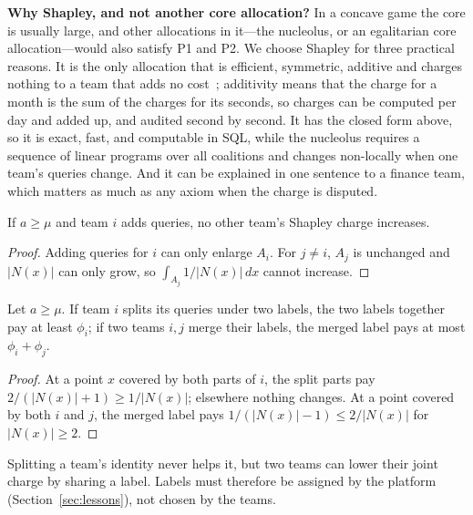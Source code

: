 \documentclass[sigconf]{acmart}
\begin{document}
\textbf{Why Shapley, and not another core allocation?} In a concave game the core is usually large, and other allocations
in it---the nucleolus, or an egalitarian core allocation---would also satisfy P1 and P2. We choose Shapley for three
practical reasons. It is the only allocation that is efficient, symmetric, additive and charges nothing to a team that adds
no cost~\cite{shapley53}; additivity means that the charge for a month is the sum of the charges for its seconds, so
charges can be computed per day and added up, and audited second by second. It has the closed form above, so it is exact,
fast, and computable in SQL, while the nucleolus requires a sequence of linear programs over all coalitions and changes
non-locally when one team's queries change. And it can be explained in one sentence to a finance team, which matters as
much as any axiom when the charge is disputed.

\begin{proposition}\label{prop:bystander}
If $a \ge \mu$ and team $i$ adds queries, no other team's Shapley charge increases.
\end{proposition}
\begin{proof}
Adding queries for $i$ can only enlarge $A_i$. For $j \neq i$, $A_j$ is unchanged and $|N(x)|$ can only grow, so
$\int_{A_j} 1/|N(x)|\,dx$ cannot increase.
\end{proof}

\begin{proposition}[Labels]\label{prop:labels}
Let $a \ge \mu$. If team $i$ splits its queries under two labels, the two labels together pay at least $\phi_i$; if two
teams $i, j$ merge their labels, the merged label pays at most $\phi_i + \phi_j$.
\end{proposition}
\begin{proof}
At a point $x$ covered by both parts of $i$, the split parts pay $2/(|N(x)|+1) \ge 1/|N(x)|$; elsewhere nothing changes.
At a point covered by both $i$ and $j$, the merged label pays $1/(|N(x)|-1) \le 2/|N(x)|$ for $|N(x)| \ge 2$.
\end{proof}
Splitting a team's identity never helps it, but two teams can lower their joint charge by sharing a label. Labels must
therefore be assigned by the platform (Section~\ref{sec:lessons}), not chosen by the teams.
\end{document}

